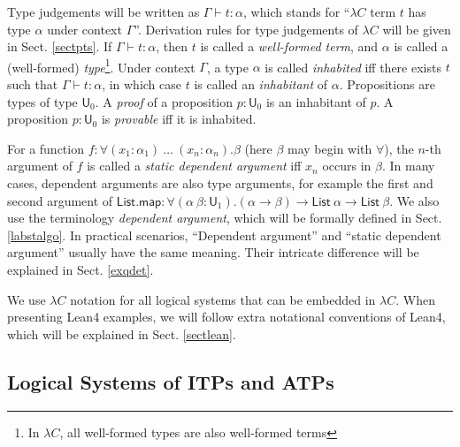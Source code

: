   Type judgements will be written as $\Gamma \vdash t : \alpha$, which stands for ``$\lambda C$ term $t$
  has type $\alpha$ under context $\Gamma$''. Derivation rules for type judgements of
  $\lambda C$ will be given in Sect. \ref{sectpts}. If $\Gamma \vdash t : \alpha$, then $t$ is
  called a \textit{well-formed term}, and $\alpha$ is called a (well-formed)
  \textit{type}\footnote{In $\lambda C$, all well-formed types are also well-formed terms}.
  Under context $\Gamma$, a type $\alpha$ is called \textit{inhabited} iff there exists $t$ such
  that $\Gamma \vdash t : \alpha$, in which case $t$ is called an \textit{inhabitant} of $\alpha$.
  Propositions are types of type $\mathsf{U}_0$. A \textit{proof} of a proposition
  $p : \mathsf{U}_0$ is an inhabitant of $p$. A proposition $p : \mathsf{U}_0$ is \textit{provable}
  iff it is inhabited.

  For a function $f : \forall (x_1 : \alpha_1) \ \dots \ (x_n : \alpha_n). \beta$ (here $\beta$ may begin with $\forall$),
  the $n$-th argument of $f$ is called a \textit{static dependent argument} iff $x_n$ occurs in $\beta$.
  In many cases, dependent arguments are also type arguments, for example the first and second argument
  of $\mathsf{List.map} : \forall (\alpha \ \beta : \mathsf{U}_1). (\alpha \to \beta) \to \mathsf{List} \ \alpha \to \mathsf{List} \ \beta$.
  We also use the terminology \textit{dependent argument}, which will be formally defined in
  Sect. \ref{labstalgo}. In practical scenarios, ``Dependent argument'' and ``static dependent argument'' usually
  have the same meaning. Their intricate difference will be explained in Sect. \ref{exqdet}.

  We use $\lambda C$ notation for all logical systems that can be embedded in $\lambda C$.
  When presenting Lean4 examples, we will follow extra notational conventions
  of Lean4, which will be explained in Sect. \ref{sectlean}.

\subsection{Logical Systems of ITPs and ATPs}\label{sublogsys}

